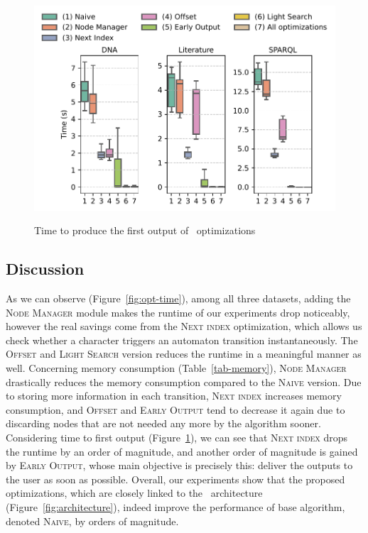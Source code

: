 \begin{figure}[t]
	\centering
	\includegraphics[width=.8\textwidth]{figures/versions-fot.pdf}
	\label{fig:opt-firstOT}
	\caption{Time to produce the first output of \rematch\ optimizations}
	\label{fig-optimizations}
\end{figure}




\subsection{Discussion}
As we can observe (Figure~\ref{fig:opt-time}), among all three datasets, adding
the \textsc{Node Manager} module makes the runtime of our experiments drop
noticeably, however the real savings come from the \textsc{Next index}
optimization, which allows us check whether a character triggers an automaton
transition instantaneously. The \textsc{Offset} and \textsc{Light Search}
version reduces the runtime in a meaningful manner as well. Concerning memory
consumption (Table~\ref{tab-memory}), \textsc{Node Manager} drastically reduces
the memory consumption compared to the \textsc{Naive} version. Due to storing
more information in each transition, \textsc{Next index} increases memory
consumption, and \textsc{Offset} and \textsc{Early Output} tend to decrease it
again due to discarding nodes that are not needed any more by the algorithm
sooner. Considering time to first output (Figure~\ref{fig-optimizations}), we
can see that \textsc{Next index} drops the runtime by an order of magnitude, and
another order of magnitude is gained by \textsc{Early Output}, whose main
objective is precisely this: deliver the outputs to the user as soon as
possible. Overall, our experiments show that the proposed optimizations, which
are closely linked to the \rematch\ architecture
(Figure~\ref{fig:architecture}), indeed improve the performance of base
algorithm, denoted \textsc{Naive}, by orders of magnitude.



